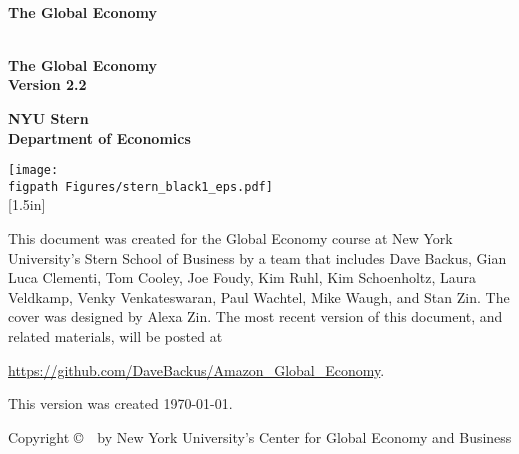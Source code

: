 \begin{titlepage}

\begin{center}
\textsc{}\\[1.5in]
{\Huge\bf\sffamily The Global Economy} \\ [0.5in]
\end{center}

\pagebreak
\phantom{x}
\thispagestyle{empty}

\pagebreak
\thispagestyle{empty}
\begin{center}
\textsc{}\\[1.5in]
{\Huge\bf\sffamily The Global Economy} \\ [0.25in]
{\huge\bf\sffamily Version 2.2}

\vspace*{1.00in}
{\huge\bf\sffamily NYU Stern}\\[1ex]
{\huge\bf\sffamily Department of  Economics}


\vfill
{\texttt{[image: \\figpath Figures/stern\_black1\_eps.pdf]}\\
[1.5in]
}
\end{center}


\newpage
\thispagestyle{empty}
\phantom{x}
\vfill
This document was created for the Global Economy course at New York
University's Stern School of Business by a team that includes
Dave Backus, Gian Luca Clementi, Tom Cooley, Joe Foudy, Kim Ruhl,
Kim Schoenholtz, Laura Veldkamp, Venky Venkateswaran, Paul Wachtel, Mike Waugh,
and Stan Zin.
The cover was designed by Alexa Zin.
The most recent version of this document, and related materials,
will be posted at

\vspace*{\parskip}
\centerline{\url{https://github.com/DaveBackus/Amazon_Global_Economy}.}

This version was created \today.

Copyright \copyright \ \number\year \ by New York University's Center for Global Economy and Business


\end{titlepage}
